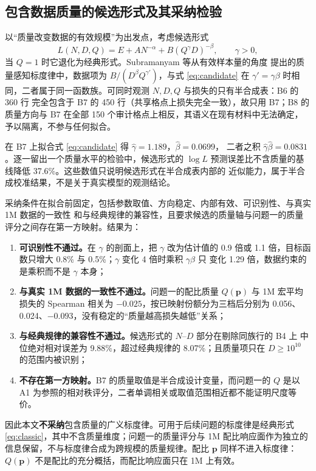 \subsection{包含数据质量的候选形式及其采纳检验}

以“质量改变数据的有效规模”为出发点，考虑候选形式
\begin{equation}
  L(N,D,Q)=E+A N^{-\alpha}+B\left(Q^{\gamma}D\right)^{-\beta},\qquad \gamma>0,
  \label{eq:candidate}
\end{equation}
当 $Q=1$ 时它退化为经典形式。Subramanyam 等\cite{subramanyam2026quality}从有效样本量的角度
提出的质量感知标度律中，数据项为 $B/(D^{\beta}Q^{\gamma'})$，与式 \eqref{eq:candidate} 在
$\gamma'=\gamma\beta$ 时相同，二者属于同一函数族。可同时观测 $N,D,Q$ 与损失的只有半合成表：B6 的 360 行
完全包含于 B7 的 450 行（共享格点上损失完全一致），故只用 B7；B8 的质量方向与 B7 在全部
150 个审计格点上相反，其语义在现有材料中无法确定，予以隔离，不参与任何拟合。

在 B7 上拟合式 \eqref{eq:candidate} 得 $\hat\gamma=1.189$，$\hat\beta=0.0699$，
二者之积 $\hat\gamma\hat\beta=0.0831$。逐一留出一个质量水平的检验中，候选形式的
$\log L$ 预测误差比不含质量的基线降低 37.6\%。这些数值只说明候选形式在半合成表内部的
近似能力，属于半合成校准结果，不是关于真实模型的观测结论。

采纳条件在拟合前固定，包括参数取值、方向稳定、内部有效、可识别性、与真实 1M 数据的一致性
和与经典规律的兼容性，且要求候选的质量轴与问题一的质量评分之间存在第一方映射。结果为：
\begin{enumerate}
  \item \textbf{可识别性不通过。}在 $\gamma$ 的剖面上，把 $\gamma$ 改为估计值的 0.9 倍或
        1.1 倍，目标函数只增大 0.8\% 与 0.5\%；$\gamma$ 变化 4 倍时乘积 $\gamma\beta$ 只
        变化 1.29 倍，数据约束的是乘积而不是 $\gamma$ 本身；
  \item \textbf{与真实 1M 数据的一致性不通过。}问题一的配比质量 $Q(\boldsymbol{p})$ 与
        1M 宏平均损失的 Spearman 相关为 $-0.025$，按已映射份额分为三档后分别为 0.056、
        0.024、$-0.093$，没有稳定的“质量越高损失越低”关系；
  \item \textbf{与经典规律的兼容性不通过。}候选形式的 $N$--$D$ 部分在剔除同族行的 B4 上
        中位绝对相对误差为 9.88\%，超过经典规律的 8.07\%；且质量项只在 $D\ge10^{10}$ 的范围内被识别；
  \item \textbf{不存在第一方映射。}B7 的质量取值是半合成设计变量，而问题一的 $Q$ 是以 A1
        为参照的相对秩评分，二者单调相关或取值范围相近都不能证明尺度等价。
\end{enumerate}
因此本文\textbf{不采纳}包含质量的广义标度律。可用于后续问题的标度律是经典形式
\eqref{eq:classic}，其中不含质量维度；问题一的质量评分与 1M 配比响应面作为独立的
信息保留，不与标度律合成为跨规模的质量规律。配比 $\boldsymbol{p}$ 同样不进入标度律：
$Q(\boldsymbol{p})$ 不是配比的充分概括，而配比响应面只在 1M 上有效。

